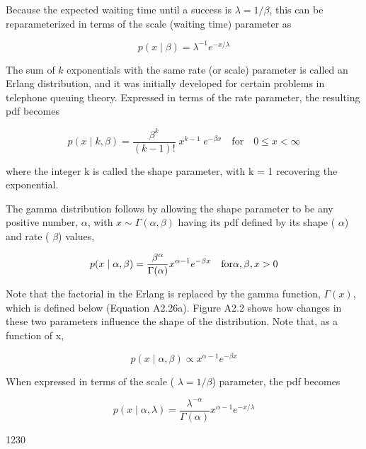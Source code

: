 \documentclass{article}
\begin{document}
Because the expected waiting time until a success is  $ \lambda = 1/\beta $, this can be reparameterized in terms of the scale (waiting time) parameter as

\begin{equation}
p(x\mid\beta)=\lambda^{-1}e^{-x/\lambda}
\end{equation}

The sum of  $ k $ exponentials with the same rate (or scale) parameter is called an Erlang distribution, and it was initially developed for certain problems in telephone queuing theory. Expressed in terms of the rate parameter, the resulting pdf becomes

\begin{equation}
p(x\mid k,\beta)=\frac{\beta^{k}}{(k-1)!}\;x^{k-1}\;e^{-\beta x}\quad\mathrm{f o r}\quad0\leq x<\infty
\end{equation}

where the integer k is called the shape parameter, with k = 1 recovering the exponential.

The gamma distribution follows by allowing the shape parameter to be any positive number,  $ \alpha $, with  $ x \sim \Gamma(\alpha, \beta) $ having its pdf defined by its shape ( $ \alpha $) and rate ( $ \beta $) values,

\begin{equation}
\begin{align*}p(x\mid\alpha,\beta)=\frac{\beta^\alpha}{\Gamma(\alpha)}x^{\alpha-1}e^{-\beta x}\quad{\rm for}\alpha,\beta,x>0\end{align*}
\end{equation}

Note that the factorial in the Erlang is replaced by the gamma function,  $ \Gamma(x) $, which is defined below (Equation A2.26a). Figure A2.2 shows how changes in these two parameters influence the shape of the distribution. Note that, as a function of x,

\begin{equation}
p(x\mid\alpha,\beta)\propto x^{\alpha-1}e^{-\beta x}
\end{equation}

When expressed in terms of the scale ( $ \lambda = 1/\beta $) parameter, the pdf becomes

\begin{equation}
p(x\mid\alpha,\lambda)=\frac{\lambda^{-\alpha}}{\Gamma(\alpha)}x^{\alpha-1}e^{-x/\lambda}
\end{equation}

1230
\end{document}
